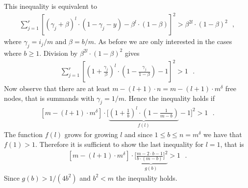 \let\accentvec\vec \documentclass{llncs}
\newcommand{\keys}{\ensuremath{n}}
\newcommand{\cells}{\ensuremath{m}}
\newcommand{\blank}{\text{ }}
\newcommand{\low}{\ensuremath{l}}
\newcommand{\bl}{\beta}
\newcommand{\hf}{\gamma}
\begin{document}
This inequality is equivalent to
\begin{align*}
 \sum_{j=1}^r \left[ (\hf_j+\bl)^{\low}\cdot (1-\hf_j-y) - \bl^\low\cdot(1-\bl)\right]^2 >  \bl^{2\low}\cdot(1-\bl)^2 \blank,
\end{align*}
where $\hf_j=i_j/\cells$ and $\bl=b/\cells$.
As before we are only interested in the cases where $b\geq 1$.
Division by $\bl^{2\low}\cdot(1-\bl)^2$ gives
\begin{align*}
 \sum_{j=1}^r \left[ \left(1+\frac{\hf_j}{\bl}\right)^{\low}\cdot \left(1-\frac{\hf_j}{1-\bl}\right) - 1\right]^2 >  1 \blank.
\end{align*}
Now observe that there are at least $\cells-(\low+1)\cdot \keys=\cells-(\low+1)\cdot \cells^\delta$ free nodes,
that is summands with $\hf_j=1/\cells$.
Hence the inequality holds if
\begin{align*}
  \left[\cells-(\low+1)\cdot \cells^\delta \right]\cdot \Bigg[ \underbrace{\left(1+\frac{1}{b}\right)^{\low}\cdot \left(1-\frac{1}{m-b}\right)}_{f(\low)} - 1\Bigg]^2 >  1 \blank.
\end{align*}
The function $f(\low)$ grows for growing $\low$ and since $1\leq b\leq n=m^\delta$ we have that $f(1)>1$.
Therefore it is sufficient to show the last inequality for $\low=1$, that is
\begin{align*}
  \left[\cells-(\low+1)\cdot \cells^\delta \right]\cdot \underbrace{\Bigg[ \frac{\cells-2\cdot b-1}{b\cdot(m-b)}\Bigg]^2}_{g(b)} >  1 \blank.
\end{align*}
Since $g(b)>1/(4b^2)$ and $b^2<m$ the inequality holds.
\fi
\end{document}
